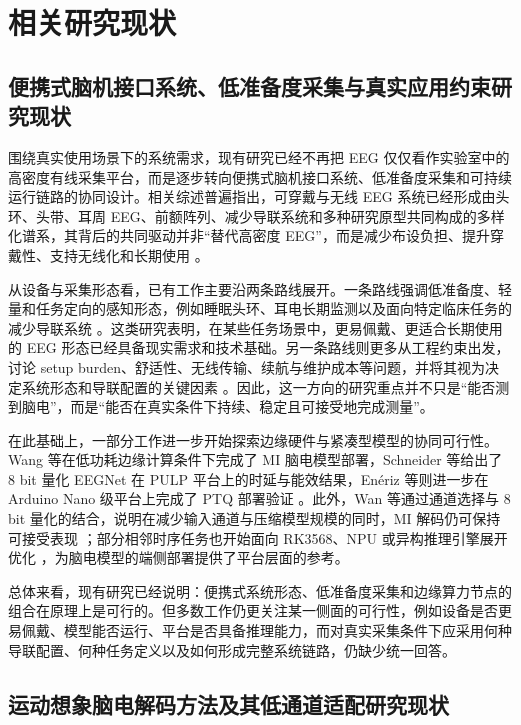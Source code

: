 \section{相关研究现状}
\subsection{便携式脑机接口系统、低准备度采集与真实应用约束研究现状}

围绕真实使用场景下的系统需求，现有研究已经不再把 EEG 仅仅看作实验室中的高密度有线采集平台，而是逐步转向便携式脑机接口系统、低准备度采集和可持续运行链路的协同设计。相关综述普遍指出，可穿戴与无线 EEG 系统已经形成由头环、头带、耳周 EEG、前额阵列、减少导联系统和多种研究原型共同构成的多样化谱系，其背后的共同驱动并非“替代高密度 EEG”，而是减少布设负担、提升穿戴性、支持无线化和长期使用 \cite{Cas19c, Nis22, He23}。

从设备与采集形态看，已有工作主要沿两条路线展开。一条路线强调低准备度、轻量和任务定向的感知形态，例如睡眠头环、耳电长期监测以及面向特定临床任务的减少导联系统 \cite{Arn20, Deb15, Bio22}。这类研究表明，在某些任务场景中，更易佩戴、更适合长期使用的 EEG 形态已经具备现实需求和技术基础。另一条路线则更多从工程约束出发，讨论 setup burden、舒适性、无线传输、续航与维护成本等问题，并将其视为决定系统形态和导联配置的关键因素 \cite{Cas19c, Nis22, He23}。因此，这一方向的研究重点并不只是“能否测到脑电”，而是“能否在真实条件下持续、稳定且可接受地完成测量”。

在此基础上，一部分工作进一步开始探索边缘硬件与紧凑型模型的协同可行性。Wang 等在低功耗边缘计算条件下完成了 MI 脑电模型部署，Schneider 等给出了 8 bit 量化 EEGNet 在 PULP 平台上的时延与能效结果，En\'eriz 等则进一步在 Arduino Nano 级平台上完成了 PTQ 部署验证 \cite{Wan20, Sch20, Ene23}。此外，Wan 等通过通道选择与 8 bit 量化的结合，说明在减少输入通道与压缩模型规模的同时，MI 解码仍可保持可接受表现 \cite{Wan22b}；部分相邻时序任务也开始面向 RK3568、NPU 或异构推理引擎展开优化 \cite{You24, Ism23}，为脑电模型的端侧部署提供了平台层面的参考。

总体来看，现有研究已经说明：便携式系统形态、低准备度采集和边缘算力节点的组合在原理上是可行的。但多数工作仍更关注某一侧面的可行性，例如设备是否更易佩戴、模型能否运行、平台是否具备推理能力，而对真实采集条件下应采用何种导联配置、何种任务定义以及如何形成完整系统链路，仍缺少统一回答。

\subsection{运动想象脑电解码方法及其低通道适配研究现状}

